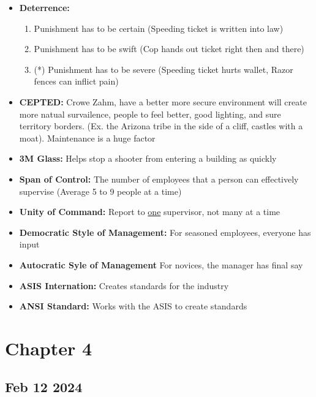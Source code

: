\documentclass[12pt]{article}
\begin{document}
\begin{itemize}
		  \item \textbf{Deterrence:} 
					 \begin{enumerate}
								\item Punishment has to be certain (Speeding ticket is written into law)
								\item Punishment has to be swift (Cop hands out ticket right then and there)
								\item (*) Punishment has to be severe (Speeding ticket hurts wallet, Razor fences can 
										  inflict pain)
					 \end{enumerate}
		  \item \textbf{CEPTED:} Crowe Zahm, have a better more secure environment will create more natual
					 survailence, people to feel better, good lighting, and sure territory borders. 
					 (Ex. the Arizona tribe in the side of a cliff, castles with a moat). Maintenance is a 
					 huge factor
		  \item \textbf{3M Glass:} Helps stop a shooter from entering a building as quickly
		  \item \textbf{Span of Control:} The number of employees that a person can effectively supervise
					 (Average 5 to 9 people at a time)
		  \item \textbf{Unity of Command:} Report to \underline{one} supervisor, not many at a time
		  \item \textbf{Democratic Style of Management:} For seasoned employees, everyone has input
		  \item \textbf{Autocratic Syle of Management} For novices, the manager has final say
		  \item \textbf{ASIS Internation:} Creates standards for the industry 
		  \item \textbf{ANSI Standard:} Works with the ASIS to create standards 
\end{itemize}

\section*{Chapter 4}

\subsection*{Feb 12 2024}
\end{document}

